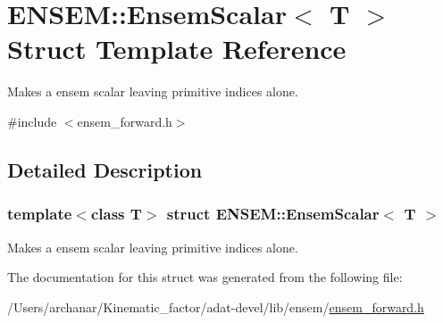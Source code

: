 \hypertarget{structENSEM_1_1EnsemScalar}{}\section{E\+N\+S\+EM\+:\+:Ensem\+Scalar$<$ T $>$ Struct Template Reference}
\label{structENSEM_1_1EnsemScalar}


Makes a ensem scalar leaving primitive indices alone.  




{\ttfamily \#include $<$ensem\+\_\+forward.\+h$>$}



\subsection{Detailed Description}
\subsubsection*{template$<$class T$>$\newline
struct E\+N\+S\+E\+M\+::\+Ensem\+Scalar$<$ T $>$}

Makes a ensem scalar leaving primitive indices alone. 

The documentation for this struct was generated from the following file\+:\begin{DoxyCompactItemize}
\item 
/\+Users/archanar/\+Kinematic\+\_\+factor/adat-\/devel/lib/ensem/\mbox{\hyperlink{adat-devel_2lib_2ensem_2ensem__forward_8h}{ensem\+\_\+forward.\+h}}\end{DoxyCompactItemize}
